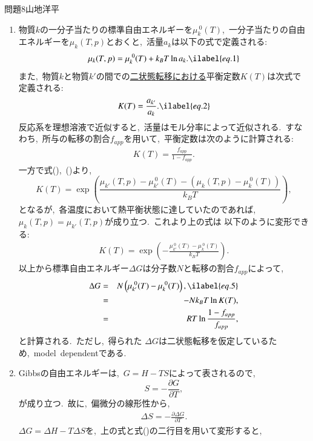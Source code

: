 \documentclass[fleqn]{jbook}
\begin{document}
\begin{answer}{問題8}{山地洋平}
\begin{enumerate}
\item
物質$k$の一分子当たりの標準自由エネルギーを$\mu^{\ 0}_{k} (T)$,\ 一分子当たりの自由エネルギーを$\mu _{k} (T,p)$とおくと,\
活量$a_{k}$は以下の式で定義される:
\begin{eqnarray}
\mu_{k} (T,p) = \mu^{\ 0}_{k} (T) + k_{B}T\ln a_{k}. \ilabel{eq.1}
\end{eqnarray}
また,\ 物質$k$と物質$k'$の間での\underline{二状態転移における}平衡定数$K(T)$は次式で定義される:
\begin{eqnarray}
K(T) = \frac{a_{k'}}{a_{k}}. \ilabel{eq.2}
\end{eqnarray}
\quad 反応系を理想溶液で近似すると,\ 活量はモル分率によって近似される.\ すなわち,\ 所与の転移の割合$f_{app}$を用いて,\
平衡定数は次のように計算される:
\begin{eqnarray}
K(T) = \frac{f_{app}}{1-f_{app}}.
\end{eqnarray}
一方で式(),\ ()より,\
\[
K(T) = \exp
\left( \frac{ \mu_{k'} (T,p) - \mu^{\ 0}_{k'} (T) - \left(\mu_{k} (T,p) - \mu^{\ 0}_{k} (T) \right)  }{ k_{B} T }  \right),
\]
となるが,\ 各温度において熱平衡状態に達していたのであれば,\ $\mu_{k} (T,p) = \mu_{k'} (T,p)$が成り立つ.\ これより上の式は
以下のように変形できる:
\begin{eqnarray}
K(T) = \exp
\left(  -\frac{ \mu^{\ 0}_{k'} (T) - \mu^{\ 0}_{k} (T)  }{ k_{B} T }  \right).
\end{eqnarray}
以上から標準自由エネルギー$\Delta G$は分子数$N$と転移の割合$f_{app}$によって,\
\begin{eqnarray}
\Delta G &=& N \left(\mu^{\ 0}_{k'} (T) - \mu^{\ 0}_{k} (T) \right), \ilabel{eq.5} \\
&=&-N k_{B} T \ln K(T) ,\nonumber\\
&=&\displaystyle  RT \ln\frac{1-f_{app}}{f_{app}},\nonumber
\end{eqnarray}
と計算される.\ ただし,\ 得られた $\Delta G$は二状態転移を仮定しているため,\ model\ dependentである.
\item
Gibbsの自由エネルギーは,\ $G=H-TS$によって表されるので,\
\[
S=-\frac{\partial G}{\partial T},
\]
が成り立つ.\ 故に,\ 偏微分の線形性から,\
\begin{eqnarray}
\Delta S = -\frac{\partial \Delta G}{\partial T}.
\end{eqnarray}
$\Delta G= \Delta H- T \Delta S$を,\ 上の式と式()の二行目を用いて変形すると,\
\begin{eqnarray}

\end{eqnarray}
\end{enumerate}
\end{answer}
\end{document}
